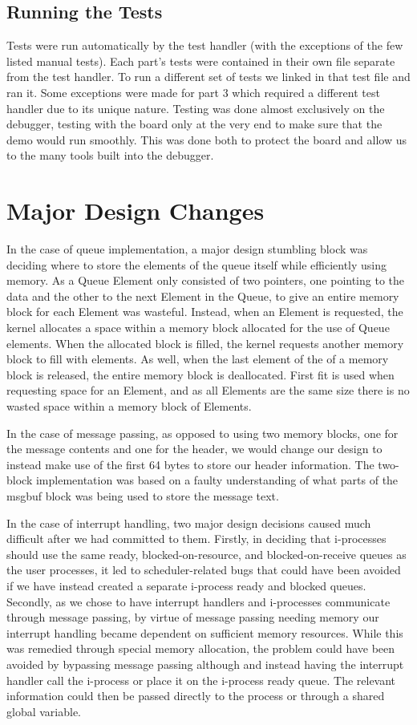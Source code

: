 \documentclass[11pt, oneside]{article}
\begin{document}
\subsection{Running the Tests} Tests were run automatically by the test handler (with the exceptions of the few listed manual tests). Each part's tests were contained in their own file separate from the test handler. To run a different set of tests we linked in that test file and ran it. Some exceptions were made for part 3 which required a different test handler due to its unique nature. Testing was done almost exclusively on the debugger, testing with the board only at the very end to make sure that the demo would run smoothly. This was done both to protect the board and allow us to the many tools built into the debugger.


\section{Major Design Changes}

In the case of queue implementation, a major design stumbling block was deciding where to store the elements of the queue itself while efficiently using memory. As a Queue Element only consisted of two pointers, one pointing to the data and the other to the next Element in the Queue, to give an entire memory block for each Element was wasteful. Instead, when an Element is requested, the kernel allocates a space within a memory block allocated for the use of Queue elements. When the allocated block is filled, the kernel requests another memory block to fill with elements. As well, when the last element of the of a memory block is released, the entire memory block is deallocated. First fit is used when requesting space for an Element, and as all Elements are the same size there is no wasted space within a memory block of Elements.

In the case of message passing, as opposed to using two memory blocks, one for the message contents and one for the header, we would change our design to instead make use of the first 64 bytes to store our header information. The two-block implementation  was based on a faulty understanding of what parts of the msgbuf block was being used to store the message text.

In the case of interrupt handling, two major design decisions caused much difficult after we had committed to them. Firstly, in deciding that i-processes should use the same ready, blocked-on-resource, and blocked-on-receive queues as the user processes, it led to scheduler-related bugs that could have been avoided if we have instead created a separate i-process ready and blocked queues. Secondly, as we chose to have interrupt handlers and i-processes communicate through message passing, by virtue of message passing needing memory our interrupt handling became dependent on sufficient memory resources. While this was remedied through special memory allocation, the problem could have been avoided by bypassing message passing although and instead having the interrupt handler call the i-process or place it on the i-process ready queue. The relevant information could then be passed directly to the process or through a shared global variable.
\end{document}
